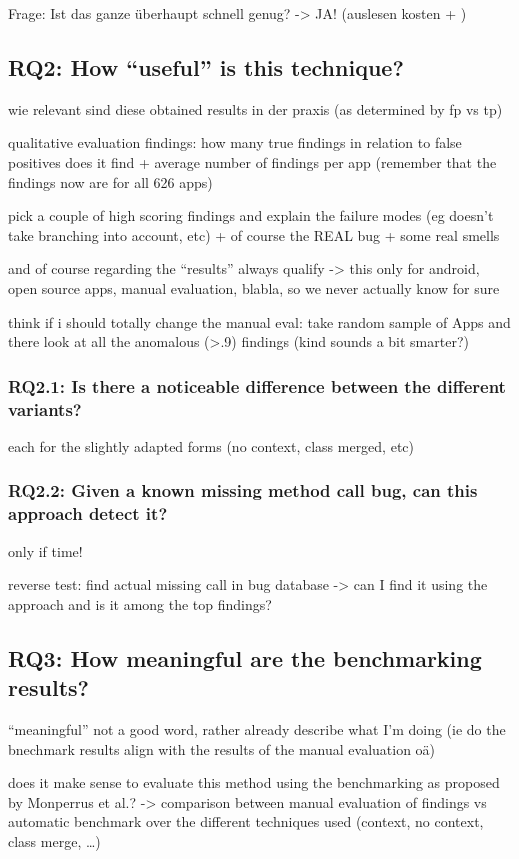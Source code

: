Frage: Ist das ganze überhaupt schnell genug?
-> JA!
(auslesen kosten + )

\subsection{RQ2: How ``useful'' is this technique?}
wie relevant sind diese obtained results in der praxis (as determined by fp vs tp)

qualitative evaluation findings:
how many true findings in relation to false positives does it find + average number of findings per app (remember that the findings now are for all 626 apps)

pick a couple of high scoring findings and explain the failure modes (eg doesn't take branching into account, etc)
+ of course the REAL bug + some real smells

and of course regarding the ``results'' always qualify -> this only for android, open source apps, manual evaluation, blabla, so we never actually know for sure

think if i should totally change the manual eval: take random sample of Apps and there look at all the anomalous (>.9) findings (kind sounds a bit smarter?)

\subsubsection{RQ2.1: Is there a noticeable difference between the different variants?}
each for the slightly adapted forms (no context, class merged, etc)

\subsubsection{RQ2.2: Given a known missing method call bug, can this approach detect it?}
only if time!

reverse test: find actual missing call in bug database -> can I find it using the approach and is it among the top findings?

\subsection{RQ3: How meaningful are the benchmarking results?}
``meaningful'' not a good word, rather already describe what I'm doing (ie do the bnechmark results align with the results of the manual evaluation oä)

does it make sense to evaluate this method using the benchmarking as proposed by Monperrus et al.?
-> comparison between manual evaluation of findings vs automatic benchmark over the different techniques used (context, no context, class merge, \ldots)

